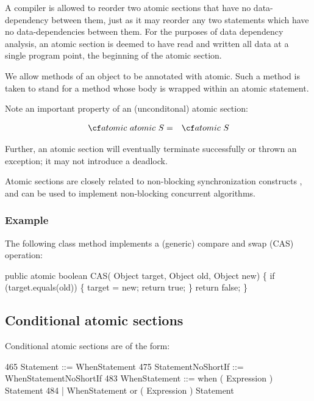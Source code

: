 {{A compiler is allowed to reorder two atomic sections that have no
data-dependency between them, just as it may reorder any two
statements which have no data-dependencies between them. For the
purposes of data dependency analysis, an atomic section is deemed to
have read and written all data at a single program point, the
beginning of the atomic section.

We allow methods of an object to be annotated with {\cf atomic}. Such
a method is taken to stand for a method whose body is wrapped within an
{\cf atomic} statement.

Note an important property of an (unconditonal) atomic section:

\begin{eqnarray}
 {\cf atomic\ atomic}\ S &=& {\cf atomic}\ S
\end{eqnarray}

Further, an atomic section will eventually terminate successfully or
thrown an exception; it may not introduce a deadlock.

Atomic sections are closely related to non-blocking synchronization
constructs \cite{herlihy91waitfree}, and can be used to implement 
non-blocking concurrent algorithms.

\subsubsection{Example}

The following class method implements a (generic) compare and swap (CAS) operation:

\begin{x10}
public atomic boolean CAS( Object target, 
                           Object old, 
                           Object new) \{
   if (target.equals(old)) \{
     target = new;
     return true;
   \}
   return false;
\}
\end{x10}

\subsection{Conditional atomic sections}

Conditional atomic sections are of the form:
\begin{x10}
465 Statement ::= WhenStatement
475 StatementNoShortIf ::= WhenStatementNoShortIf
483 WhenStatement ::= 
          when ( Expression ) Statement
484     | WhenStatement 
          or ( Expression ) Statement
\end{x10}

}}
